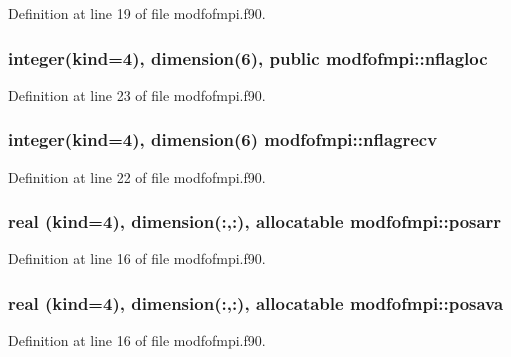 Definition at line 19 of file modfofmpi.\-f90.

\hypertarget{classmodfofmpi_a9b2252c09a83a3f47fc6aec6462a68dc}{
\subsubsection[{nflagloc}]{\setlength{\rightskip}{0pt plus 5cm}integer(kind=4), dimension(6), public modfofmpi\-::nflagloc}}\label{classmodfofmpi_a9b2252c09a83a3f47fc6aec6462a68dc}


Definition at line 23 of file modfofmpi.\-f90.

\hypertarget{classmodfofmpi_aa8c0fc08baf8d208d7e2cddd0600ff99}{
\subsubsection[{nflagrecv}]{\setlength{\rightskip}{0pt plus 5cm}integer(kind=4), dimension(6) modfofmpi\-::nflagrecv}}\label{classmodfofmpi_aa8c0fc08baf8d208d7e2cddd0600ff99}


Definition at line 22 of file modfofmpi.\-f90.

\hypertarget{classmodfofmpi_a240c326e64798f0d4f7fd2a785eaddfb}{
\subsubsection[{posarr}]{\setlength{\rightskip}{0pt plus 5cm}real (kind=4), dimension(\-:,\-:), allocatable modfofmpi\-::posarr}}\label{classmodfofmpi_a240c326e64798f0d4f7fd2a785eaddfb}


Definition at line 16 of file modfofmpi.\-f90.

\hypertarget{classmodfofmpi_a91f992ee7447a7fb3c5430233f3f39ab}{
\subsubsection[{posava}]{\setlength{\rightskip}{0pt plus 5cm}real (kind=4), dimension(\-:,\-:), allocatable modfofmpi\-::posava}}\label{classmodfofmpi_a91f992ee7447a7fb3c5430233f3f39ab}


Definition at line 16 of file modfofmpi.\-f90.

